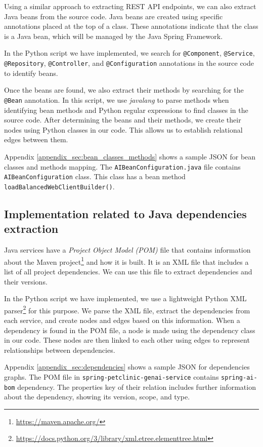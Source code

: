 Using a similar approach to extracting REST API endpoints, we can also extract Java beans from the source code. Java beans are created using specific annotations placed at the top of a class. These annotations indicate that the class is a Java bean, which will be managed by the Java Spring Framework.

In the Python script we have implemented, we search for \texttt{@Component}, \texttt{@Service}, \texttt{@Repository}, \texttt{@Controller}, and \texttt{@Configuration} annotations in the source code to identify beans.

Once the beans are found, we also extract their methods by searching for the \texttt{@Bean} annotation. In this script, we use \textit{javalang} to parse methods when identifying bean methods and Python regular expressions to find classes in the source code. After determining the beans and their methods, we create their nodes using Python classes in our code. This allows us to establish relational edges between them.

Appendix \ref{appendix_sec:bean_classes_methods} shows a sample JSON for bean classes and methods mapping. The \texttt{AIBeanConfiguration.java} file contains \texttt{AIBeanConfiguration} class. This class has a bean method \texttt{loadBalancedWebClientBuilder()}.

\subsection{Implementation related to Java dependencies extraction}

Java services have a \textit{Project Object Model (POM)} file that contains information about the Maven project\footnote{\url{https://maven.apache.org/}} and how it is built. It is an XML file that includes a list of all project dependencies. We can use this file to extract dependencies and their versions.

In the Python script we have implemented, we use a lightweight Python XML parser\footnote{\url{https://docs.python.org/3/library/xml.etree.elementtree.html}} for this purpose. We parse the XML file, extract the dependencies from each service, and create nodes and edges based on this information. When a dependency is found in the POM file, a node is made using the dependency class in our code. These nodes are then linked to each other using edges to represent relationships between dependencies.

Appendix \ref{appendix_sec:dependencies} shows a sample JSON for dependencies graphs. The POM file in \texttt{spring-petclinic-genai-service} contains \texttt{spring-ai-bom} dependency. The properties key of their relation includes further information about the dependency, showing its version, scope, and type.


